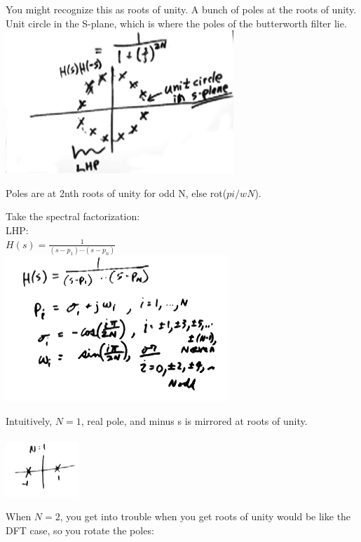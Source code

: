 You might recognize this as roots of unity. A bunch of poles at the roots
of unity. Unit circle in the S-plane, which is where the poles of the butterworth
filter lie. 
 \\
\includegraphics[scale=0.5]{frames/15e}

Poles are at 2nth roots of unity for odd N, else rot($pi/wN$).

Take the spectral factorization:  \\
LHP: \\
$H(s) = \frac{1}{(s - p_1) \cdots (s- p_n)}$
 \\
\includegraphics[scale=0.5]{frames/15g}

Intuitively, $N =1$, real pole, and minus s is mirrored at roots of unity.\\

\\
\includegraphics[scale=0.9]{frames/15h}

When $N = 2$, you get into trouble when you get roots of unity would be like
the DFT case, so you rotate the poles:\\

